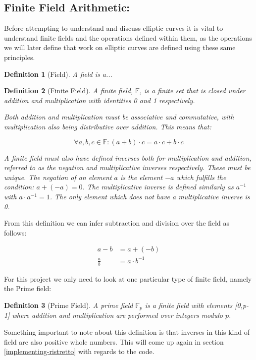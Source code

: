 \documentclass{article}
\newtheorem{definition}{Definition}[section]
\newcommand{\eq}[1]{\begin{equation*}\begin{split}#1\end{split}\end{equation*}}
\newcommand{\F}{\mathbb{F}}
\begin{document}
\subsection{Finite Field Arithmetic:} \label{Finite Field Arithmetic}

Before attempting to understand and discuss elliptic curves it is vital
to understand finite fields and the operations defined within them, as
the operations we will later define that work on elliptic curves are
defined using these same principles.

\begin{definition}[Field]
	A field is a...
\end{definition}

\begin{definition}[Finite Field]
	A finite field, $\F$, is a finite set that is closed under
	addition and multiplication with identities 0 and 1 respectively.

	Both addition and multiplication must be associative and commutative,
	with multiplication also being distributive over addition. This means
	that:

	$$\forall a,b,c \in \F: (a+b) \cdot c = a \cdot c + b \cdot c$$

	A finite field must also have defined inverses both for multiplication
	and addition, referred to as the negation and multiplicative inverses
	respectively. These must be unique. The negation of an element $a$ is
	the element $-a$ which fulfills the condition: $a + (-a) = 0$. The
	multiplicative inverse is defined similarly as $a^{-1}$ with
	$a \cdot a^{-1} = 1$. The only element which does not have a
	multiplicative inverse is 0.
\end{definition}

From this definition we can infer subtraction and division over the field
as follows:

\eq{
	a-b         &= a + (-b) \\
	\frac{a}{b} &= a \cdot b^{-1}
}

For this project we only need to look at one particular type of finite
field, namely the Prime field:

\begin{definition}[Prime Field]
	A prime field $\mathbb{F}_p$ is a finite field with elements [0,p-1]
	where addition and multiplication are performed over integers
	modulo $p$.
\end{definition}

Something important to note about this definition is that inverses in
this kind of field are also positive whole numbers. This will come up
again in section \ref{implementing-ristretto} with regards to the code.
\end{document}
